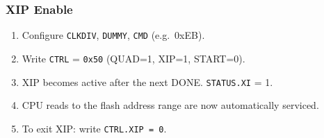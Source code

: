 \subsubsection{XIP Enable}

\begin{enumerate}
  \item Configure \texttt{CLKDIV}, \texttt{DUMMY}, \texttt{CMD} (e.g.\ 0xEB).
  \item Write \texttt{CTRL} = \texttt{0x50} (QUAD=1, XIP=1, START=0).
  \item XIP becomes active after the next DONE. \texttt{STATUS.XI} = 1.
  \item CPU reads to the flash address range are now automatically serviced.
  \item To exit XIP: write \texttt{CTRL.XIP = 0}.
\end{enumerate}

